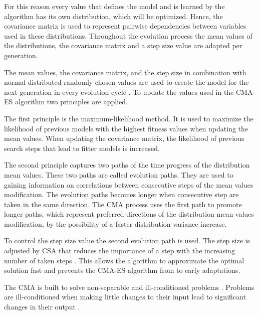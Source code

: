 For this reason every value that defines the model and is learned by the algorithm has its own distribution, which will be optimized.
Hence, the covariance matrix is used to represent pairwise dependencies between variables used in these distributions. %
Throughout the evolution process the mean values of the distributions, the covariance matrix and a step size value are adapted per generation. %

The mean values, the covariance matrix, and the step size in combination with normal distributed randomly chosen values are used to create the model for the next generation in every evolution cycle \cite{Hansen2011TheTutorial}.
To update the values used in the \ac{CMA-ES} algorithm two principles are applied.

The first principle is the maximum-likelihood method.
It is used to maximize the likelihood of previous models with the highest fitness values when updating the mean values.
When updating the covariance matrix, the likelihood of previous search steps that lead to fitter models is increased.

The second principle captures two paths of the time progress of the distribution mean values.
These two paths are called evolution paths.
They are used to gaining information on correlations between consecutive steps of the mean values modification.
The evolution paths becomes longer when consecutive step are taken in the same direction. %
The \ac{CMA} process uses the first path to promote longer paths, which represent preferred directions of the distribution mean values modification, by the possibility of a faster distribution variance increase. %

To control the step size value the second evolution path is used.
The step size is adjusted by \ac{CSA} that reduces the importance of a step with the increasing number of taken steps \cite{Chotard2012CumulativeFunctions}.
This allows the algorithm to approximate the optimal solution fast and prevents the \ac{CMA-ES} algorithm from to early adaptations. 

The \ac{CMA} is built to solve non-separable and ill-conditioned problems \cite{Hansen2011TheTutorial}.
Problems are ill-conditioned when making little changes to their input lead to significant changes in their output \cite{Belsley1980RegressionCollinearity}.

